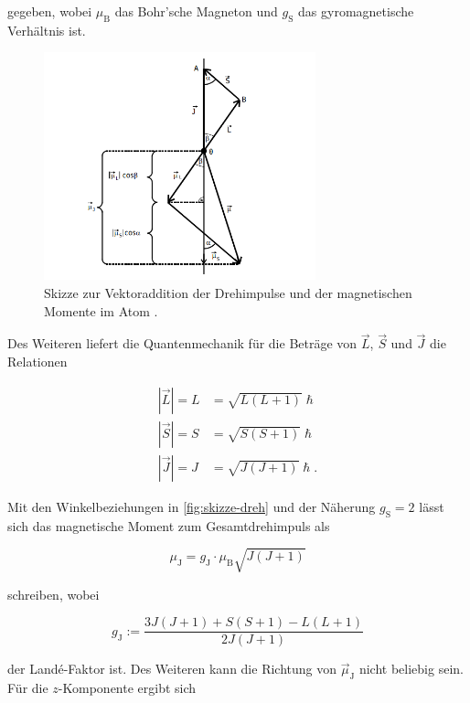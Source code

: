 gegeben, wobei $\mu_\text{B}$ das Bohr'sche Magneton und $g_\text{S}$ das gyromagnetische Verhältnis ist.

\begin{figure}
    \centering
    \includegraphics[width=0.70\textwidth]{content/skizze-drehimpuls.png}
    \caption{Skizze zur Vektoraddition der Drehimpulse und der magnetischen Momente im Atom \cite{V606}.}
    \label{fig:skizze-dreh}
\end{figure}

Des Weiteren liefert die Quantenmechanik für die Beträge von $\vec{L}$, $\vec{S}$ und $\vec{J}$ die Relationen

\begin{align} 
    |\vec{L}| = L &= \sqrt{ L ( L + 1 ) } \hslash \\
    |\vec{S}| = S &= \sqrt{ S ( S + 1 ) } \hslash \\
    |\vec{J}| = J &= \sqrt{ J ( J + 1 ) } \hslash.
\end{align}

Mit den Winkelbeziehungen in \autoref{fig:skizze-dreh} und der Näherung $g_\text{S} = 2$ lässt sich das magnetische Moment zum Gesamtdrehimpuls als

\begin{equation}
    \label{eqn:magn-moment}
    \mu_\text{J} = g_\text{J} \cdot \mu_\text{B} \sqrt{J (J + 1)}
\end{equation}

schreiben, wobei 

\begin{equation}
    \label{eqn:lande}
    g_\text{J} := \frac{ 3 J (J+1) + S(S+1) - L(L+1) }{ 2 J (J +1) }
\end{equation}

der Landé-Faktor ist.
Des Weiteren kann die Richtung von $\vec{\mu}_\text{J}$ nicht beliebig sein. Für die $z$-Komponente ergibt sich

